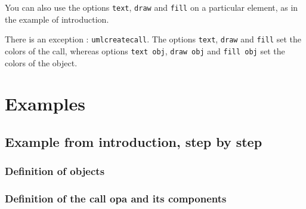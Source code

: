 \documentclass[a4paper,11pt]{report}
\newcommand{\inputTikZ}[1]{%
  }%
\newcommand{\inputTikZ}[1]{%
    \texttt{[image: fig/\#1.pdf]}%
  }%
\begin{document}
You can also use the options {\tt text}, {\tt draw} and {\tt fill} on a particular element, as in the example of introduction.

There is an exception : {\tt umlcreatecall}. The options {\tt text}, {\tt draw} and {\tt fill} set the colors of the call, whereas options {\tt text obj}, {\tt draw obj} and {\tt fill obj} set the colors of the object.

\medskip

\begin{minipage}{0.6\textwidth}

\end{minipage}
\begin{minipage}{0.4\textwidth}
\begin{center}
\inputTikZ{createcallset}
\end{center}
\end{minipage}

\section{Examples}

\subsection{Example from introduction, step by step}

\subsubsection{Definition of objects}

{\color{red!70!black}
\vspace{-0.4cm}

}

\begin{center}
\inputTikZ{seqdiagstep1}
\end{center}

\subsubsection{Definition of the call opa and its components}
\end{document}
